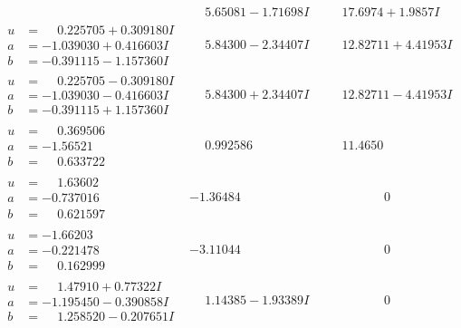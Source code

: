 \documentclass[1p]{elsarticle_modified}
\theoremstyle{definition}
\begin{document}
$$\begin{array}{c|c|c}
 & \phantom{-}5.65081 - 1.71698 I & \phantom{-}17.6974 + 1.9857 I \\ \hline\begin{aligned}
u &= \phantom{-}0.225705 + 0.309180 I \\
a &= -1.039030 + 0.416603 I \\
b &= -0.391115 - 1.157360 I\end{aligned}
 & \phantom{-}5.84300 - 2.34407 I & \phantom{-}12.82711 + 4.41953 I \\ \hline\begin{aligned}
u &= \phantom{-}0.225705 - 0.309180 I \\
a &= -1.039030 - 0.416603 I \\
b &= -0.391115 + 1.157360 I\end{aligned}
 & \phantom{-}5.84300 + 2.34407 I & \phantom{-}12.82711 - 4.41953 I \\ \hline\begin{aligned}
u &= \phantom{-}0.369506\phantom{ +0.000000I} \\
a &= -1.56521\phantom{ +0.000000I} \\
b &= \phantom{-}0.633722\phantom{ +0.000000I}\end{aligned}
 & \phantom{-}0.992586\phantom{ +0.000000I} & \phantom{-}11.4650\phantom{ +0.000000I} \\ \hline\begin{aligned}
u &= \phantom{-}1.63602\phantom{ +0.000000I} \\
a &= -0.737016\phantom{ +0.000000I} \\
b &= \phantom{-}0.621597\phantom{ +0.000000I}\end{aligned}
 & -1.36484\phantom{ +0.000000I} & \phantom{-0.000000 } 0 \\ \hline\begin{aligned}
u &= -1.66203\phantom{ +0.000000I} \\
a &= -0.221478\phantom{ +0.000000I} \\
b &= \phantom{-}0.162999\phantom{ +0.000000I}\end{aligned}
 & -3.11044\phantom{ +0.000000I} & \phantom{-0.000000 } 0 \\ \hline\begin{aligned}
u &= \phantom{-}1.47910 + 0.77322 I \\
a &= -1.195450 - 0.390858 I \\
b &= \phantom{-}1.258520 - 0.207651 I\end{aligned}
 & \phantom{-}1.14385 - 1.93389 I & \phantom{-0.000000 } 0 \\ \hline\begin{aligned}

\end{aligned}
\end{array}$$
\end{document}
